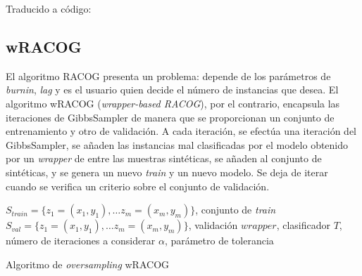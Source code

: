 Traducido a código:



\subsection{wRACOG}
El algoritmo RACOG presenta un problema: depende de los parámetros de \textit{burnin}, \textit{lag} y
es el usuario quien decide el número de instancias que desea. El algoritmo wRACOG (\textit{wrapper-based RACOG}),
por el contrario, encapsula las iteraciones de GibbsSampler de manera que se proporcionan un conjunto de 
entrenamiento y otro de validación. A cada iteración, se efectúa una iteración del GibbsSampler, se añaden 
las instancias mal clasificadas por el modelo obtenido por un \textit{wrapper} de entre las muestras sintéticas, 
se añaden al conjunto de sintéticas, y se genera un nuevo \textit{train} y un nuevo modelo. Se deja de iterar 
cuando se verifica un criterio sobre el conjunto de validación.

\begin{algorithm}[H]
\begin{algorithmic}[1]
  \REQUIRE $S_{train} = \{z_1=(x_1, y_1), \ldots z_m=(x_m, y_m)\}$, conjunto de \textit{train}
  \REQUIRE $S_{val} = \{z_1=(x_1, y_1), \ldots z_m=(x_m, y_m)\}$, validación
  \REQUIRE $wrapper$, clasificador
  \REQUIRE $T$, número de iteraciones a considerar
  \REQUIRE $\alpha$, parámetro de tolerancia
  \NEWLINE
  \ENDWHILE
  \NEWLINE
\end{algorithmic}
\caption{Algoritmo de \textit{oversampling} wRACOG}
\label{alg:wracog}
\end{algorithm}


%

